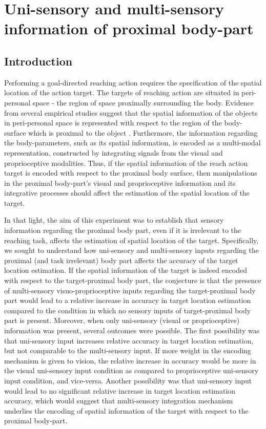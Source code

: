 \chapter{Uni-sensory and multi-sensory information of proximal body-part}
\label{exp1}

\section{Introduction}

Performing a goal-directed reaching action requires the specification of the spatial location of the action target. The targets of reaching action are situated in peri-personal space - the region of space proximally surrounding the body. Evidence from several empirical studies suggest that the spatial information of the objects in peri-personal space is represented with respect to the region of the body-surface which is proximal to the object \cite<For review, see>{serino2019peripersonal}. Furthermore, the information regarding the body-parameters, such as its spatial information, is encoded as a multi-modal representation, constructed by integrating signals from the visual and proprioceptive modalities. Thus, if the spatial information of the reach action target is encoded with respect to the proximal body surface, then manipulations in the proximal body-part's visual and proprioceptive information and its integrative processes should affect the estimation of the spatial location of the target. 

In that light, the aim of this experiment was to establish that sensory information regarding the proximal body part, even if it is irrelevant to the reaching task, affects the estimation of spatial location of the target. Specifically, we sought to understand how uni-sensory and multi-sensory inputs regarding the proximal (and task irrelevant) body part affects the accuracy of the target location estimation. If the spatial information of the target is indeed encoded with respect to the target-proximal body part, the conjecture is that the presence of multi-sensory visuo-proprioceptive inputs regarding the target-proximal body part would lead to a relative increase in accuracy in target location estimation compared to the condition in which no sensory inputs of target-proximal body part is present. Moreover, when only uni-sensory (visual or proprioceptive) information was present, several outcomes were possible. The first possibility was that uni-sensory input increases relative accuracy in target location estimation, but not comparable to the multi-sensory input. If more weight in the encoding mechanism is given to vision, the relative increase in accuracy would be more in the visual uni-sensory input condition as compared to proprioceptive uni-sensory input condition, and vice-versa. Another possibility was that uni-sensory input would lead to no significant relative increase in target location estimation accuracy, which would suggest that multi-sensory integration mechanism underlies the encoding of spatial information of the target with respect to the proximal body-part.


